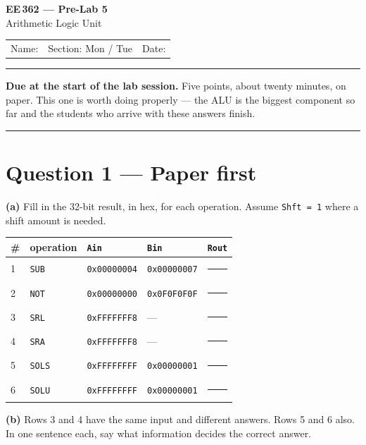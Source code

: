\documentclass[11pt]{article}
\newcommand{\code}[1]{\texttt{#1}}
\begin{document}
\begin{center}
{\Large\bfseries EE\,362 --- Pre-Lab 5}\\[2pt]
{\large Arithmetic Logic Unit}\\[6pt]
\begin{tabular}{@{}p{6.5cm}p{4cm}p{4cm}@{}}
Name: \hrulefill & Section: Mon / Tue & Date: \hrulefill
\end{tabular}
\end{center}

\vspace{2pt}\hrule\vspace{4pt}

{\small\textbf{Due at the start of the lab session.} Five points, about twenty
minutes, on paper. This one is worth doing properly --- the ALU is the biggest
component so far and the students who arrive with these answers finish.}

\vspace{4pt}\hrule

\section*{Question 1 --- Paper first}

\textbf{(a)} Fill in the 32-bit result, in hex, for each operation. Assume
\code{Shft = 1} where a shift amount is needed.

\begin{center}
\begin{tabular}{llll@{\hskip 8pt}||@{\hskip 8pt}l}
\toprule
\# & operation & \code{Ain} & \code{Bin} & \code{Rout} \\
\midrule
1 & \code{SUB}  & \code{0x00000004} & \code{0x00000007} & \rule{3.6cm}{0.4pt} \\[5pt]
2 & \code{NOT}  & \code{0x00000000} & \code{0x0F0F0F0F} & \rule{3.6cm}{0.4pt} \\[5pt]
3 & \code{SRL}  & \code{0xFFFFFFF8} & --- & \rule{3.6cm}{0.4pt} \\[5pt]
4 & \code{SRA}  & \code{0xFFFFFFF8} & --- & \rule{3.6cm}{0.4pt} \\[5pt]
5 & \code{SOLS} & \code{0xFFFFFFFF} & \code{0x00000001} & \rule{3.6cm}{0.4pt} \\[5pt]
6 & \code{SOLU} & \code{0xFFFFFFFF} & \code{0x00000001} & \rule{3.6cm}{0.4pt} \\
\bottomrule
\end{tabular}
\end{center}

\textbf{(b)} Rows 3 and 4 have the same input and different answers. Rows 5 and 6
also. In one sentence each, say what information decides the correct answer.
\end{document}
